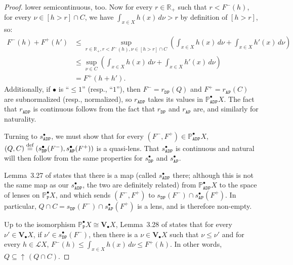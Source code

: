 \documentclass[preprint,12pt]{elsarticle}
\newcommand\eqdef{\mathrel{\buildrel \text{def}\over=}}
\newcommand{\Rp}{\mathbb{R}_+}
\DeclareMathOperator{\upc}{\uparrow\!}
\newcommand\Lform{\mathcal L}
\newcommand\Pred{\mathbb{P}}
\newcommand\Angel{{\mathtt{A}}}
\newcommand\Demon{{\mathtt{D}}}
\newcommand\Nature{{\mathtt{P}}}
\newcommand\AN{{\Angel\Nature}}
\newcommand\DN{{\Demon\Nature}}
\newcommand\ADN{{\Angel\Demon\Nature}}
\newcommand\Val{{\mathbf V}}
\begin{document}
\begin{proof}
  lower semicontinuous, too.  Now for every $r \in \Rp$ such that
  $r < F^- (h)$, for every $\nu \in [h > r] \cap C$, we have
  $\int_{x \in X} h (x) \,d\nu > r$ by definition of $[h > r]$, so:
  \begin{align*}
    F^- (h) + F^+ (h')
    & \leq \sup_{r \in \Rp, r < F^- (h), \nu \in [h > r] \cap C}
      \left(\int_{x \in X} h (x) \,d\nu + \int_{x \in X} h' (x)
      \,d\nu\right) \\
    & \leq \sup_{\nu \in C}
      \left(\int_{x \in X} h (x) \,d\nu + \int_{x \in X} h' (x)
      \,d\nu\right) \\
    & = F^+ (h+h').
  \end{align*}
  Additionally, if $\bullet$ is ``$\leq 1$'' (resp., ``$1$''), then
  $F^- = r_\DN (Q)$ and $F^+ = r_\AN (C)$ are subnormalized (resp.,
  normalized), so $r_\ADN$ takes its values in $\Pred_\ADN^\bullet X$.
  The fact that $r_\ADN$ is continuous follows from the fact that
  $r_\DN$ and $r_\AN$ are, and similarly for naturality.

  Turning to $s_\ADN^\bullet$, we must show that for every
  $(F^-, F^+) \in \Pred_\ADN^\bullet X$,
  $(Q, C) \eqdef (s_\DN^\bullet (F^-), s_\AN^\bullet (F^+))$ is a
  quasi-lens.  That $s_\ADN^\bullet$ is continuous and natural will
  then follow from the same properties for $s_\DN^\bullet$ and
  $s_\AN^\bullet$.

  Lemma~3.27 of \cite{JGL-mscs16} %
  states that there is a map (called $s_\ADN^\bullet$ there; although
  this is not the same map as our $s_\ADN^\bullet$, the two are
  definitely related) from $\Pred_\ADN^\bullet X$ to the space of
  lenses on $\Pred_\Nature^\bullet X$, and which sends $(F^-, F^+)$ to
  $s_\DN (F^-) \cap s_\AN^\bullet (F^+)$.  %
  In particular, $Q \cap C = s_\DN (F^-) \cap s_\AN^\bullet (F^+)$ is
  a lens, and is therefore non-empty.

  Up to the isomorphism
  $\Pred_\Nature^\bullet X \cong \Val_\bullet X$, Lemma~3.28 of
  \cite{JGL-mscs16} %
  states that for every
  $\nu' \in \Val_\bullet X$, if $\nu' \in s_\DN^\bullet (F^-)$, then
  there is a $\nu \in \Val_\bullet X$ such that $\nu \leq \nu'$ and
  for every $h \in \Lform X$,
  $F^- (h) \leq \int_{x \in X} h (x) \,d\nu \leq F^+ (h)$.  In other
  words, $Q \subseteq \upc (Q \cap C)$.


\end{proof}
\end{document}
